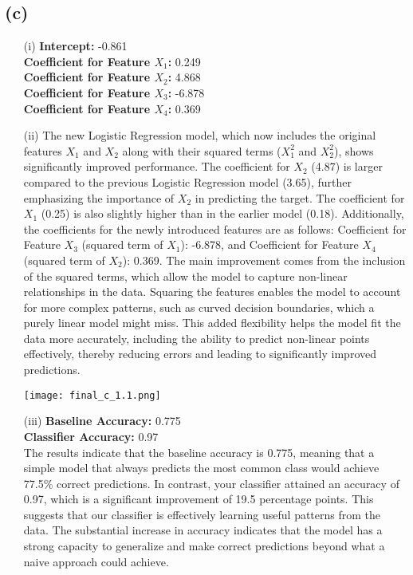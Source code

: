 \documentclass{article}
\begin{document}
\subsection*{(c)}
\begin{enumerate}
    \item[(i)] 
    \textbf{Intercept:} -0.861 \\
    \textbf{Coefficient for Feature $X_1$:} 0.249 \\
    \textbf{Coefficient for Feature $X_2$:} 4.868 \\ 
    \textbf{Coefficient for Feature $X_3$:} -6.878 \\
    \textbf{Coefficient for Feature $X_4$:} 0.369 \\

    \item[(ii)] The new Logistic Regression model, which now includes the original features \( X_1 \) and \( X_2 \) along with their squared terms (\( X_1^2 \) and \( X_2^2 \)), shows significantly improved performance. The coefficient for \( X_2 \) (4.87) is larger compared to the previous Logistic Regression model (3.65), further emphasizing the importance of \( X_2 \) in predicting the target. The coefficient for \( X_1 \) (0.25) is also slightly higher than in the earlier model (0.18). Additionally, the coefficients for the newly introduced features are as follows: Coefficient for Feature \( X_3 \) (squared term of \( X_1 \)): -6.878, and Coefficient for Feature \( X_4 \) (squared term of \( X_2 \)): 0.369. The main improvement comes from the inclusion of the squared terms, which allow the model to capture non-linear relationships in the data. Squaring the features enables the model to account for more complex patterns, such as curved decision boundaries, which a purely linear model might miss. This added flexibility helps the model fit the data more accurately, including the ability to predict non-linear points effectively, thereby reducing errors and leading to significantly improved predictions.
    \begin{center}
         \texttt{[image: final\_c\_1.1.png]}
         \centering
    \end{center}

    \item[(iii)] \textbf{Baseline Accuracy:} 0.775 \\
\textbf{Classifier Accuracy:} 0.97 \\

The results indicate that the baseline accuracy is 0.775, meaning that a simple model that always predicts the most common class would achieve 77.5\% correct predictions. In contrast, your classifier attained an accuracy of 0.97, which is a significant improvement of 19.5 percentage points. This suggests that our classifier is effectively learning useful patterns from the data. The substantial increase in accuracy indicates that the model has a strong capacity to generalize and make correct predictions beyond what a naive approach could achieve.



\end{enumerate}
\end{document}
